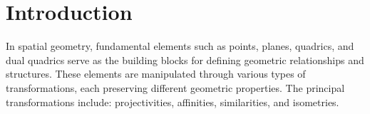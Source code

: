\section{Introduction}

In spatial geometry, fundamental elements such as points, planes, quadrics, and dual quadrics serve as the building blocks for defining geometric relationships and structures. 
These elements are manipulated through various types of transformations, each preserving different geometric properties. 
The principal transformations include: projectivities, affinities, similarities, and isometries.